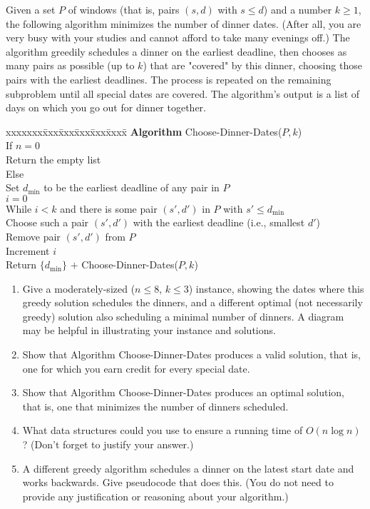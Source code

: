 \documentclass[11pt]{article}
\def\question#1{\red{#1}}
\def\red#1{{\color{red}#1}}
\begin{document}
Given a set $P$ of windows (that is, pairs $(s,d)$ with $s \le d$)
and a number $k \ge 1$, the following algorithm 
minimizes the number of dinner dates.
(After all, you are very busy with your studies and cannot
afford to take many evenings off.)
The algorithm greedily schedules a dinner on the earliest deadline,
then chooses as many pairs as possible (up to $k$) that are "covered"
by this dinner, choosing those pairs with the earliest deadlines.  The
process is repeated on the remaining subproblem until all special
dates are covered. The algorithm's output is
a list of days on which you go out for dinner together.

\begin{tabbing}
xxxxxxx\=xxx\=xxx\=xxx\=xxx\=xxxx\= \kill
\> {\bf Algorithm} Choose-Dinner-Dates($P, k$) \\
\>\>   If $n = 0$ \\
\>\>\>   Return the empty list \\
\>\>   Else \\
\>\>\>   Set $d_{\min}$ to be the earliest deadline of any pair in $P$ \\
\>\>\>   $i=0$ \\
\>\>\>   While $i<k$ and there is some pair $(s',d')$ in $P$ with $s' \le d_{\min}$ \\
\>\>\>\>    Choose such a pair $(s',d')$ with the earliest deadline (i.e., smallest $d'$) \\
\>\>\>\>    Remove pair $(s',d')$ from $P$ \\
\>\>\>\>    Increment $i$ \\
\>\>\>   Return $\{d_{\min}\}$ $+$ Choose-Dinner-Dates($P,k$) 
\end{tabbing}

\begin{enumerate}
\item \question{Give a moderately-sized ($n \le 8$, $k \le 3$) instance, showing the dates where this greedy solution schedules the dinners, and a different optimal (not necessarily greedy) solution also  scheduling a minimal number of dinners.}  
   A diagram may be helpful in illustrating your instance and solutions.

\item \question{Show that Algorithm Choose-Dinner-Dates produces a valid solution, that is, one for which you earn credit for every special date.}

\item \question{Show that Algorithm Choose-Dinner-Dates produces an optimal solution, that is, one that minimizes the number of dinners scheduled.}

\item \question{What data structures could you use to ensure a running time of $O(n \log n)$? (Don't forget to justify your answer.)}

\item A different greedy algorithm
schedules a dinner on the latest start date and works
backwards.  \question{Give pseudocode that does this.} (You do not need
to provide any justification or reasoning about your algorithm.)
\end{enumerate}
\end{document}
